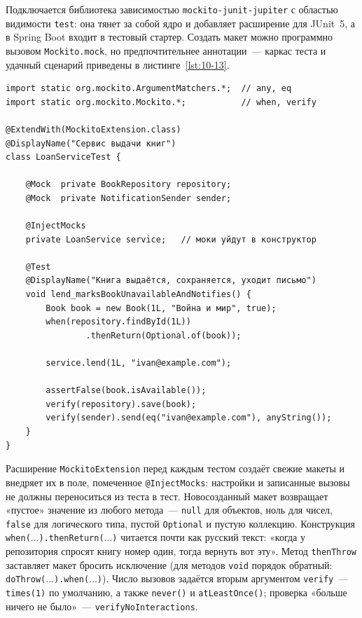 Подключается библиотека зависимостью \texttt{mockito-junit-jupiter} с областью видимости \texttt{test}: она тянет за собой ядро и добавляет расширение для JUnit~5, а в Spring Boot входит в тестовый стартер. Создать макет можно программно вызовом \texttt{Mockito.mock}, но предпочтительнее аннотации~--- каркас теста и удачный сценарий приведены в листинге~\ref{lst:10-13}.

\begin{listing}[H]
\begin{verbatim}
import static org.mockito.ArgumentMatchers.*;  // any, eq
import static org.mockito.Mockito.*;           // when, verify

@ExtendWith(MockitoExtension.class)
@DisplayName("Сервис выдачи книг")
class LoanServiceTest {

    @Mock  private BookRepository repository;
    @Mock  private NotificationSender sender;

    @InjectMocks
    private LoanService service;   // моки уйдут в конструктор

    @Test
    @DisplayName("Книга выдаётся, сохраняется, уходит письмо")
    void lend_marksBookUnavailableAndNotifies() {
        Book book = new Book(1L, "Война и мир", true);
        when(repository.findById(1L))
                .thenReturn(Optional.of(book));

        service.lend(1L, "ivan@example.com");

        assertFalse(book.isAvailable());
        verify(repository).save(book);
        verify(sender).send(eq("ivan@example.com"), anyString());
    }
}
\end{verbatim}
\caption{Настройка макетов и проверка вызовов}
\label{lst:10-13}
\end{listing}

Расширение \texttt{MockitoExtension} перед каждым тестом создаёт свежие макеты и внедряет их в поле, помеченное \texttt{@InjectMocks}: настройки и записанные вызовы не должны переноситься из теста в тест. Новосозданный макет возвращает «пустое» значение из любого метода~--- \texttt{null} для объектов, ноль для чисел, \texttt{false} для логического типа, пустой \texttt{Optional} и пустую коллекцию. Конструкция \texttt{when($\ldots$).thenReturn($\ldots$)} читается почти как русский текст: «когда у репозитория спросят книгу номер один, тогда вернуть вот эту». Метод \texttt{thenThrow} заставляет макет бросить исключение (для методов \texttt{void} порядок обратный: \texttt{doThrow($\ldots$).when($\ldots$)}). Число вызовов задаётся вторым аргументом \texttt{verify}~--- \texttt{times(1)} по умолчанию, а также \texttt{never()} и \texttt{atLeastOnce()}; проверка «больше ничего не было»~--- \texttt{verifyNoInteractions}.

